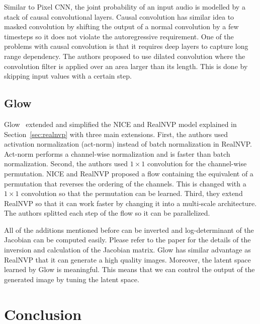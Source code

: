 \documentclass[runningheads]{llncs}
\begin{document}
Similar to Pixel CNN, the joint probability of an input audio is modelled by a stack of causal convolutional layers. Causal convolution has similar idea to masked convolution by shifting the output of a normal convolution by a few timesteps so it does not violate the autoregressive requirement. One of the problems with causal convolution is that it requires deep layers to capture long range dependency. The authors proposed to use dilated convolution where the convolution filter is applied over an area larger than its length. This is done by skipping input values with a certain step. 

\subsection{Glow}
Glow~\cite{kingma2018glow} extended and simplified the NICE and RealNVP model explained in Section~\ref{sec:realnvp} with three main extensions. First, the authors used activation normalization (act-norm) instead of batch normalization in RealNVP.  Act-norm performs a channel-wise normalization and is faster than batch normalization. Second, the authors used $1\times1$ convolution for the channel-wise permutation. NICE and RealNVP proposed a flow containing the equivalent of a permutation that reverses the ordering of the channels. This is changed with a $1\times1$ convolution so that the permutation can be learned.  Third, they extend RealNVP so that it can work faster by changing it into a multi-scale architecture. The authors splitted each step of the flow so it can be parallelized.

All of the additions mentioned before can be inverted and log-determinant of the Jacobian can be computed easily. Please refer to the paper for the details of the inversion and calculation of the Jacobian matrix. Glow has similar advantage as RealNVP that it can generate a high quality images. Moreover, the latent space learned by Glow is meaningful. This means that we can control the output of the generated image by tuning the latent space.


\section{Conclusion}
%
%
%
% 
% 
%

 
\end{document}
